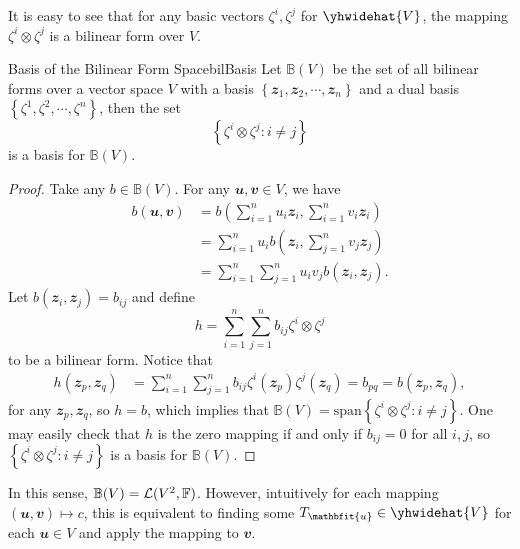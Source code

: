 \documentclass[math, code]{amznotes}
\theoremstyle{remark}
\begin{document}
It is easy to see that for any basic vectors $\zeta^i, \zeta^j$ for $\yhwidehat{V}$, the mapping $\zeta^i \otimes \zeta^j$ is a bilinear form over $V$.
\begin{probox}{Basis of the Bilinear Form Space}{bilBasis}
    Let $\mathbb{B}(V)$ be the set of all bilinear forms over a vector space $V$ with a basis $\left\{\mathbfit{z}_1, \mathbfit{z}_2, \cdots, \mathbfit{z}_n\right\}$ and a dual basis $\left\{\zeta^1, \zeta^2, \cdots, \zeta^n\right\}$, then the set 
    \begin{equation*}
        \left\{\zeta^i \otimes \zeta^j \colon i \neq j \right\}
    \end{equation*}
    is a basis for $\mathbb{B}(V)$.
    \tcblower
    \begin{proof}
        Take any $b \in \mathbb{B}(V)$. For any $\mathbfit{u}, \mathbfit{v} \in V$, we have 
        \begin{align*}
            b(\mathbfit{u}, \mathbfit{v}) & = b\left(\sum_{i = 1}^{n}u_i\mathbfit{z}_i, \sum_{i = 1}^{n}v_i\mathbfit{z}_i\right) \\
            & = \sum_{i = 1}^{n}u_ib\left(\mathbfit{z}_i, \sum_{j = 1}^{n}v_j\mathbfit{z}_j\right) \\
            & = \sum_{i = 1}^{n}\sum_{j = 1}^{n}u_iv_jb\left(\mathbfit{z}_i, \mathbfit{z}_j\right).
        \end{align*}
        Let $b\left(\mathbfit{z}_i, \mathbfit{z}_j\right) = b_{ij}$ and define 
        \begin{equation*}
            h = \sum_{i = 1}^{n}\sum_{j = 1}^{n}b_{ij}\zeta^i \otimes \zeta^j
        \end{equation*}
        to be a bilinear form. Notice that 
        \begin{align*}
            h\left(\mathbfit{z}_p, \mathbfit{z}_q\right) & = \sum_{i = 1}^{n}\sum_{j = 1}^{n}b_{ij}\zeta^i\left(\mathbfit{z}_p\right)\zeta^j\left(\mathbfit{z}_q\right) = b_{pq} = b\left(\mathbfit{z}_p, \mathbfit{z}_q\right),
        \end{align*}
        for any $\mathbfit{z}_p, \mathbfit{z}_q$, so $h = b$, which implies that $\mathbb{B}(V) = \mathrm{span}\left\{\zeta^i \otimes \zeta^j \colon i \neq j \right\}$. One may easily check that $h$ is the zero mapping if and only if $b_{ij} = 0$ for all $i, j$, so $\left\{\zeta^i \otimes \zeta^j \colon i \neq j \right\}$ is a basis for $\mathbb{B}(V)$.
    \end{proof}
\end{probox}
In this sense, $\mathbb{B}(V) = \mathcal{L}(V^2, \mathbb{F})$. However, intuitively for each mapping $(\mathbfit{u}, \mathbfit{v}) \mapsto c$, this is equivalent to finding some $T_{\mathbfit{u}} \in \yhwidehat{V}$ for each $\mathbfit{u} \in V$ and apply the mapping to $\mathbfit{v}$.
\end{document}
